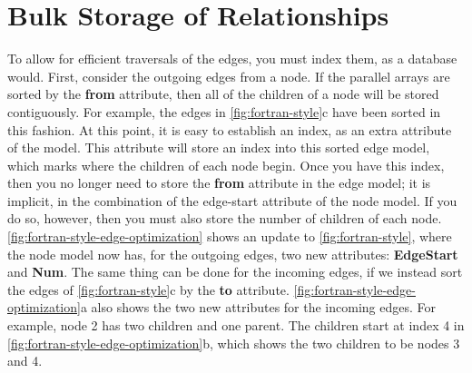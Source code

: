\section{Bulk Storage of Relationships}

To allow for efficient traversals of the edges, you must index them, as a
database would. First, consider the outgoing edges from a node. If the
 parallel arrays are sorted by the \textbf{from} attribute, then
all of the children of a node will be stored contiguously. For example, the
edges in \autoref{fig:fortran-style}c have been sorted in this fashion.
At this point, it is
easy to establish an index, as an extra attribute of the  model.
This attribute will store an index into this sorted edge model, which marks where the
children of each node begin. Once you have this index, then you no longer need to
store the \textbf{from} attribute in the edge model; it is implicit, in the
combination of the edge-start attribute of the node model. If you do so,
however, then you must also store the number of children of each node. 
\autoref{fig:fortran-style-edge-optimization} shows an update to
\autoref{fig:fortran-style}, where the node model now has, for the outgoing
edges, two new attributes: \textbf{EdgeStart} and \textbf{Num}. The same thing
can be done for the incoming edges, if we instead sort the edges of 
\autoref{fig:fortran-style}c by the \textbf{to} attribute.
\autoref{fig:fortran-style-edge-optimization}a also shows the two new attributes
for the incoming edges.  For example, node 2 has two children and
one parent. The children start at index 4 in
\autoref{fig:fortran-style-edge-optimization}b, which shows the two children to
be nodes 3 and 4.

